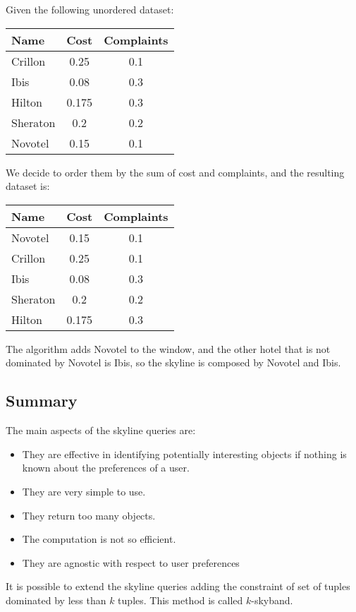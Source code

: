 \begin{example}
    Given the following unordered dataset: 
    \begin{table}[H]
        \centering
        \begin{tabular}{lcc}
        \textbf{Name}                 & \textbf{Cost} & \textbf{Complaints} \\ \hline
        \multicolumn{1}{l|}{Crillon}  & 0.25  & 0.1        \\
        \multicolumn{1}{l|}{Ibis}     & 0.08  & 0.3        \\
        \multicolumn{1}{l|}{Hilton}   & 0.175 & 0.3        \\
        \multicolumn{1}{l|}{Sheraton} & 0.2   & 0.2        \\
        \multicolumn{1}{l|}{Novotel}  & 0.15  & 0.1       
        \end{tabular}
    \end{table}
    We decide to order them by the sum of cost and complaints, and the resulting dataset is: 
    \begin{table}[H]
        \centering
        \begin{tabular}{lcc}
        \textbf{Name}                 & \textbf{Cost} & \textbf{Complaints} \\ \hline
        \multicolumn{1}{l|}{Novotel}  & 0.15          & 0.1                 \\
        \multicolumn{1}{l|}{Crillon}  & 0.25          & 0.1                 \\
        \multicolumn{1}{l|}{Ibis}     & 0.08          & 0.3                 \\
        \multicolumn{1}{l|}{Sheraton} & 0.2           & 0.2                 \\
        \multicolumn{1}{l|}{Hilton}   & 0.175         & 0.3                
        \end{tabular}
    \end{table}
    The algorithm adds Novotel to the window, and the other hotel that is not dominated by Novotel is Ibis, so the skyline is composed by Novotel and Ibis. 
\end{example}

\subsection*{Summary}
The main aspects of the skyline queries are: 
\begin{itemize}
    \item They are effective in identifying potentially interesting objects if nothing is known about the preferences of a user. 
    \item They are very simple to use. 
    \item They return too many objects. 
    \item The computation is not so efficient. 
    \item They are agnostic with respect to user preferences
\end{itemize}
It is possible to extend the skyline queries adding the constraint of set of tuples dominated by less than $k$ tuples. This method is called $k$-skyband.